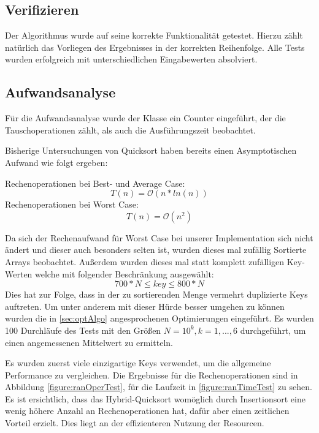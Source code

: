 \documentclass[11pt]{scrartcl}
\begin{document}
	\subsection{Verifizieren}
		\label{sec:veri}
		
		Der Algorithmus wurde auf seine korrekte Funktionalität getestet.
		Hierzu zählt natürlich das Vorliegen des Ergebnisses in der korrekten Reihenfolge.
		Alle Tests wurden erfolgreich mit unterschiedlichen Eingabewerten absolviert.
	
	\subsection{Aufwandsanalyse}
		\label{sec:aufwand}
		
		Für die Aufwandsanalyse wurde der Klasse ein Counter eingeführt, der die Tauschoperationen zählt, als auch die Ausführungszeit beobachtet. 
		
		Bisherige Untersuchungen von Quicksort haben bereits einen Asymptotischen Aufwand wie folgt ergeben:

		Rechenoperationen bei Best- und Average Case:
		\begin{equation*}
		T(n) = \mathcal{O}(n*ln(n))
		\end{equation*}
		Rechenoperationen bei Worst Case:
		\begin{equation*}
		T(n) = \mathcal{O}(n^{2})
		\end{equation*}

		Da sich der Rechenaufwand für Worst Case bei unserer Implementation sich nicht ändert 
		und dieser auch besonders selten ist, wurden dieses mal zufällig Sortierte Arrays beobachtet.
		Außerdem wurden dieses mal statt komplett zufälligen Key-Werten welche mit folgender Beschränkung ausgewählt: 
		\begin{equation*}
		700*N \leq key \leq 800*N
		\end{equation*}
		Dies hat zur Folge, dass in der zu sortierenden Menge vermehrt duplizierte Keys auftreten. 
		Um unter anderem mit dieser Hürde besser umgehen zu können wurden die in \ref{sec:optAlgo} angesprochenen Optimierungen eingeführt.
		Es wurden 100 Durchläufe des Tests mit den Größen $N=10^k, k=1,...,6$ durchgeführt, um einen angemessenen Mittelwert zu ermitteln.

		Es wurden zuerst viele einzigartige Keys verwendet, um die allgemeine Performance zu vergleichen.
		Die Ergebnisse für die Rechenoperationen sind in Abbildung \ref{figure:ranOperTest}, für die Laufzeit in \ref{figure:ranTimeTest} zu sehen.
		Es ist ersichtlich, dass das Hybrid-Quicksort womöglich durch Insertionsort eine wenig höhere Anzahl an Rechenoperationen hat, dafür aber einen zeitlichen Vorteil erzielt.
		Dies liegt an der effizienteren Nutzung der Resourcen.
\end{document}
